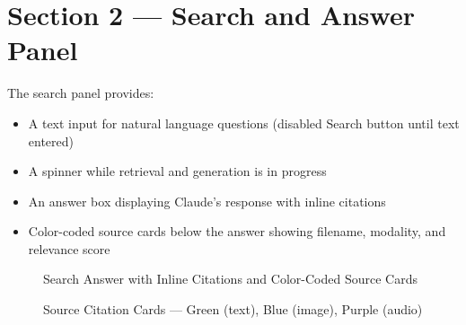 \documentclass[12pt,a4paper]{report}
\begin{document}
\section{Section 2 --- Search and Answer Panel}

The search panel provides:
\begin{itemize}[leftmargin=2cm]
    \item A text input for natural language questions (disabled Search button until text entered)
    \item A spinner while retrieval and generation is in progress
    \item An answer box displaying Claude's response with inline citations
    \item Color-coded source cards below the answer showing filename, modality, and relevance score
\end{itemize}

\begin{figure}[H]
    \centering
    \caption{Search Answer with Inline Citations and Color-Coded Source Cards}
    \label{fig:search_results}
\end{figure}

\begin{figure}[H]
    \centering
    \caption{Source Citation Cards --- Green (text), Blue (image), Purple (audio)}
    \label{fig:source_cards}
\end{figure}
\end{document}
